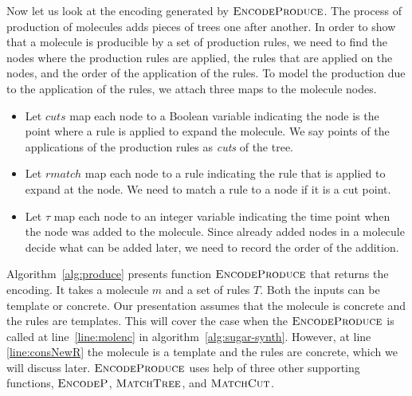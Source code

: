 Now let us look at the encoding generated by $\textsc{EncodeProduce}$.
The process of production of molecules adds pieces of trees
one after another.
In order to show that a molecule is producible by a set of production rules,
we need to find the nodes where the production rules are applied,
the rules that are applied on the nodes, and
the order of the application of the rules.
To model the production due to the application of the rules,
we attach three maps to the molecule nodes.
\begin{itemize}
\item Let $cuts$ map each node to a Boolean variable
indicating the node is the point where a rule is applied to
expand the molecule.
We say points of the applications of the production
rules as {\em cuts} of the tree.

\item Let $rmatch$ map each node to a rule indicating
  the rule that is applied to expand at the node.
  We need to match a rule to a node if it is a cut point.
\item Let $\tau$ map each node to an integer variable
  indicating the time point when the node was added to the molecule.
  Since already added nodes in a molecule decide what can be added later,
  we need to record the order of the addition.
\end{itemize}

Algorithm~\ref{alg:produce} presents function $\textsc{EncodeProduce}$
that returns the encoding.
It takes a molecule $m$ and a set of rules $T$.
Both the inputs can be template or concrete.
Our presentation assumes that the molecule is concrete and
the rules are templates.
This will cover the case when the $\textsc{EncodeProduce}$ is called at
line~\ref{line:molenc} in algorithm~\ref{alg:sugar-synth}.
However, at line \ref{line:consNewR} the molecule is a template
and the rules are concrete, which we will discuss later.
$\textsc{EncodeProduce}$ uses help of three other supporting functions,
$\textsc{EncodeP}$, $\textsc{MatchTree}$, and $\textsc{MatchCut}$.
%

